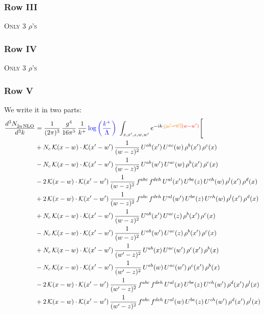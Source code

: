 \documentclass[9pt]{article}
\numberwithin{equation}{section}
\begin{document}
\subsubsection{Row III}
\textsc{Only 3 $\rho$'s}
\subsubsection{Row IV}
\textsc{Only 3 $\rho$'s}
\subsubsection{Row V}
We write it in two parts: 
\begin{align}
    \frac{d^{3}N_{2a\,\rm NLO}^{\rm}}{d^{3}k}  & = \frac{1}{(2\pi)^{3}}\,\frac{g^{4}}{16\pi^{5}}\,\frac{1}{k^{+}}\,{\color{blue}\log{\left(\frac{k^{+}}{\Lambda}\right)}}\,\,\int_{x,x',z,w,w'}e^{-ik\cdot{\color{orange}\cancel{(w'-w)}}{\color{red}(w-w')}}\Bigg[\notag\\
&+N_{c}\,\mathcal{K}(x-w)\cdot\mathcal{K}(x'-w')\,\frac{1}{(w-z)^{2}}\,U^{ab}(x')\,U^{ac}(w)\,\rho^{b}(x')\,\rho^{c}(x)\notag\\
&-N_{c}\,\mathcal{K}(x-w)\cdot\mathcal{K}(x'-w')\,\frac{1}{(w-z)^{2}}\,U^{ab}(w')\,U^{ac}(w)\,\rho^{b}(x')\,\rho^{c}(x)\notag\\
&-2\,\mathcal{K}(x-w)\cdot\mathcal{K}(x'-w')\,\frac{1}{(w-z)^{2}}\,f^{abc}\,f^{deh}\,U^{al}(x')\,U^{be}(z)\,U^{ch}(w)\,\rho^{l}(x')\,\rho^{d}(x)\notag\\
&+2\,\mathcal{K}(x-w)\cdot\mathcal{K}(x'-w')\,\frac{1}{(w-z)^{2}}\,f^{abc}\,f^{deh}\,U^{al}(w')\,U^{be}(z)\,U^{ch}(w)\,\rho^{l}(x')\,\rho^{d}(x)\notag\\
&+N_{c}\,\mathcal{K}(x-w)\cdot\mathcal{K}(x'-w')\,\frac{1}{(w-z)^{2}}\,U^{ab}(x')\,U^{ac}(z)\,\rho^{b}(x')\,\rho^{c}(x)\notag\\
&-N_{c}\,\mathcal{K}(x-w)\cdot\mathcal{K}(x'-w')\,\frac{1}{(w-z)^{2}}\,U^{ab}(w')\,U^{ac}(z)\,\rho^{b}(x')\,\rho^{c}(x)\notag\\
&+N_{c}\,\mathcal{K}(x-w)\cdot\mathcal{K}(x'-w')\,\frac{1}{(w'-z)^{2}}\,U^{ab}(x)\,U^{ac}(w')\,\rho^{c}(x')\,\rho^{b}(x)\notag\\
&-N_{c}\,\mathcal{K}(x-w)\cdot\mathcal{K}(x'-w')\,\frac{1}{(w'-z)^{2}}\,U^{ab}(w)\,U^{ac}(w')\,\rho^{c}(x')\,\rho^{b}(x)\notag\\
&-2\,\mathcal{K}(x-w)\cdot\mathcal{K}(x'-w')\,\frac{1}{(w'-z)^{2}}\,f^{abc}\,f^{deh}\,U^{al}(x)\,U^{be}(z)\,U^{ch}(w')\,\rho^{d}(x')\,\rho^{l}(x)\notag\\
&+2\,\mathcal{K}(x-w)\cdot\mathcal{K}(x'-w')\,\frac{1}{(w'-z)^{2}}\,f^{abc}\,f^{deh}\,U^{al}(w)\,U^{be}(z)\,U^{ch}(w')\,\rho^{d}(x')\,\rho^{l}(x)\notag\\

\end{align}
\end{document}
